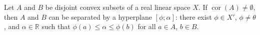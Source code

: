 Let $A$ and $B$ be disjoint convex subsets of a real linear space $X$. If $\operatorname{cor}(A) \neq \emptyset$, then $A$ and $B$ can be separated by a hyperplane $[\phi; \alpha]$: there exist $\phi \in X'$, $\phi \neq \theta$, and $\alpha \in \mathbb{R}$ such that $\phi(a) \leqslant \alpha \leqslant \phi(b)$ for all $a \in A$, $b \in B$.
